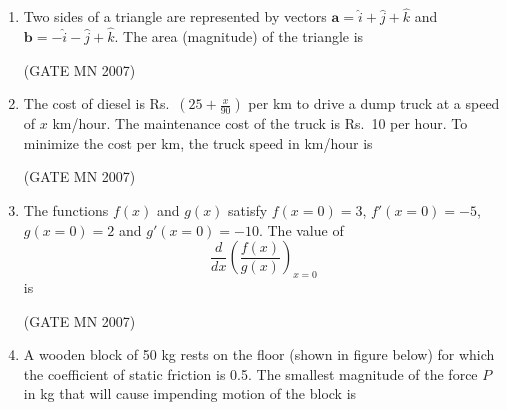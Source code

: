 \documentclass[journal]{IEEEtran}
\begin{document}
\begin{enumerate}
\item Two sides of a triangle are represented by vectors $\mathbf{a} = \hat{i} + \hat{j} + \hat{k}$ and $\mathbf{b} = -\hat{i} - \hat{j} + \hat{k}$. The area (magnitude) of the triangle is


	\hfill (GATE MN 2007)
\begin{enumerate}
\end{enumerate}


\item The cost of diesel is Rs.\ $\left(25 + \frac{x}{90}\right)$ per km to drive a dump truck at a speed of $x$ km/hour. The maintenance cost of the truck is Rs.\ 10 per hour. To minimize the cost per km, the truck speed in km/hour is


	\hfill (GATE MN 2007)
\begin{enumerate}
\end{enumerate}



\item The functions $f(x)$ and $g(x)$ satisfy $f(x=0)=3$, $f'(x=0)=-5$, $g(x=0)=2$ and $g'(x=0)=-10$. The value of 
\[
\frac{d}{dx} \left( \frac{f(x)}{g(x)} \right)_{x=0}
\]
is


\hfill (GATE MN 2007)
\begin{enumerate}
\end{enumerate}



\item A wooden block of 50 kg rests on the floor (shown in figure below) for which the coefficient of static friction is 0.5. The smallest magnitude of the force $P$ in kg that will cause impending motion of the block is



\end{enumerate}
\end{document}
